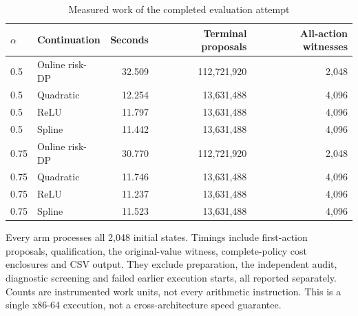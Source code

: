 \begin{table}[htbp]
\caption{Measured work of the completed evaluation attempt}\label{tab:work95}
\centering\small
\begin{tabular}{@{}llrrr@{}}
\toprule
$\alpha$ & Continuation & Seconds & Terminal proposals & All-action witnesses\\\midrule
0.5 & Online risk-DP & 32.509 & 112,721,920 & 2,048\\
0.5 & Quadratic & 12.254 & 13,631,488 & 4,096\\
0.5 & ReLU & 11.797 & 13,631,488 & 4,096\\
0.5 & Spline & 11.442 & 13,631,488 & 4,096\\
0.75 & Online risk-DP & 30.770 & 112,721,920 & 2,048\\
0.75 & Quadratic & 11.746 & 13,631,488 & 4,096\\
0.75 & ReLU & 11.237 & 13,631,488 & 4,096\\
0.75 & Spline & 11.523 & 13,631,488 & 4,096\\
\bottomrule
\end{tabular}
\par\smallskip\begin{minipage}{.98\linewidth}\footnotesize Every arm processes all 2,048 initial states. Timings include first-action proposals, qualification, the original-value witness, complete-policy cost enclosures and CSV output. They exclude preparation, the independent audit, diagnostic screening and failed earlier execution starts, all reported separately. Counts are instrumented work units, not every arithmetic instruction. This is a single x86-64 execution, not a cross-architecture speed guarantee.\end{minipage}
\end{table}
